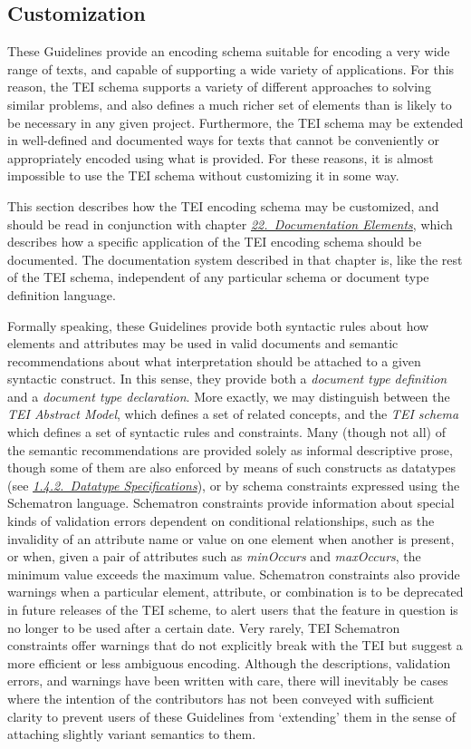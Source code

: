 \subsection[{Customization}]{Customization}\label{MD}\par
These Guidelines provide an encoding schema suitable for encoding a very wide range of texts, and capable of supporting a wide variety of applications. For this reason, the TEI schema supports a variety of different approaches to solving similar problems, and also defines a much richer set of elements than is likely to be necessary in any given project. Furthermore, the TEI schema may be extended in well-defined and documented ways for texts that cannot be conveniently or appropriately encoded using what is provided. For these reasons, it is almost impossible to use the TEI schema without customizing it in some way. \par
This section describes how the TEI encoding schema may be customized, and should be read in conjunction with chapter \textit{\hyperref[TD]{22.\ Documentation Elements}}, which describes how a specific application of the TEI encoding schema should be documented. The documentation system described in that chapter is, like the rest of the TEI schema, independent of any particular schema or document type definition language.\par
Formally speaking, these Guidelines provide both syntactic rules about how elements and attributes may be used in valid documents and semantic recommendations about what interpretation should be attached to a given syntactic construct. In this sense, they provide both a \textit{document type definition} and a \textit{document type declaration}. More exactly, we may distinguish between the \textit{TEI Abstract Model}, which defines a set of related concepts, and the \textit{TEI schema} which defines a set of syntactic rules and constraints. Many (though not all) of the semantic recommendations are provided solely as informal descriptive prose, though some of them are also enforced by means of such constructs as datatypes (see \textit{\hyperref[DTYPES]{1.4.2.\ Datatype Specifications}}), or by schema constraints expressed using the Schematron language. Schematron constraints provide information about special kinds of validation errors dependent on conditional relationships, such as the invalidity of an attribute name or value on one element when another is present, or when, given a pair of attributes such as {\itshape minOccurs} and {\itshape maxOccurs}, the minimum value exceeds the maximum value. Schematron constraints also provide warnings when a particular element, attribute, or combination is to be deprecated in future releases of the TEI scheme, to alert users that the feature in question is no longer to be used after a certain date. Very rarely, TEI Schematron constraints offer warnings that do not explicitly break with the TEI but suggest a more efficient or less ambiguous encoding.  Although the descriptions, validation errors, and warnings have been written with care, there will inevitably be cases where the intention of the contributors has not been conveyed with sufficient clarity to prevent users of these Guidelines from ‘extending’ them in the sense of attaching slightly variant semantics to them.\par
